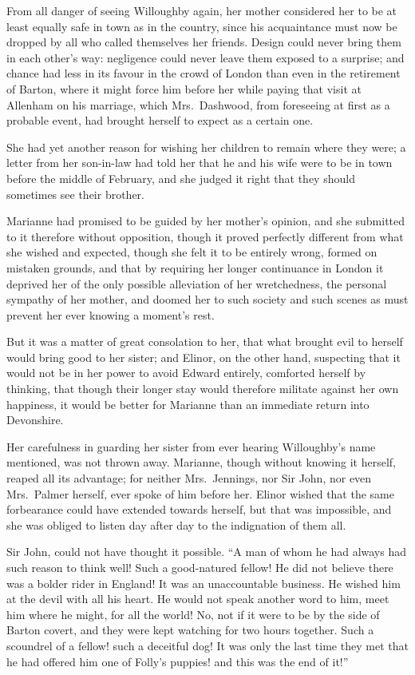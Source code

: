 \documentclass{article}
\begin{document}
From all danger of seeing Willoughby again,
her mother considered her to be at least equally safe
in town as in the country, since his acquaintance must
now be dropped by all who called themselves her friends.
Design could never bring them in each other's way:
negligence could never leave them exposed to a surprise;
and chance had less in its favour in the crowd of London
than even in the retirement of Barton, where it might
force him before her while paying that visit at Allenham
on his marriage, which Mrs.\ Dashwood, from foreseeing at
first as a probable event, had brought herself to expect
as a certain one.

She had yet another reason for wishing her children
to remain where they were; a letter from her son-in-law
had told her that he and his wife were to be in town
before the middle of February, and she judged it right
that they should sometimes see their brother.

Marianne had promised to be guided by her mother's opinion,
and she submitted to it therefore without opposition,
though it proved perfectly different from what she wished
and expected, though she felt it to be entirely wrong,
formed on mistaken grounds, and that by requiring her
longer continuance in London it deprived her of the only
possible alleviation of her wretchedness, the personal
sympathy of her mother, and doomed her to such society and
such scenes as must prevent her ever knowing a moment's rest.

But it was a matter of great consolation to her,
that what brought evil to herself would bring good to
her sister; and Elinor, on the other hand, suspecting that
it would not be in her power to avoid Edward entirely,
comforted herself by thinking, that though their longer
stay would therefore militate against her own happiness,
it would be better for Marianne than an immediate return
into Devonshire.

Her carefulness in guarding her sister from ever
hearing Willoughby's name mentioned, was not thrown away.
Marianne, though without knowing it herself, reaped all
its advantage; for neither Mrs.\ Jennings, nor Sir John,
nor even Mrs.\ Palmer herself, ever spoke of him before her.
Elinor wished that the same forbearance could have extended
towards herself, but that was impossible, and she was
obliged to listen day after day to the indignation of them all.

Sir John, could not have thought it possible.
``A man of whom he had always had such reason to think well!
Such a good-natured fellow!  He did not believe there was a
bolder rider in England!  It was an unaccountable business.
He wished him at the devil with all his heart.  He would
not speak another word to him, meet him where he might,
for all the world!  No, not if it were to be by the side
of Barton covert, and they were kept watching for two
hours together.  Such a scoundrel of a fellow! such
a deceitful dog!  It was only the last time they met
that he had offered him one of Folly's puppies! and this
was the end of it!''
\end{document}
